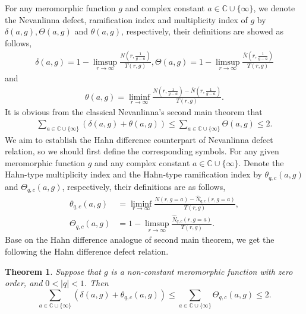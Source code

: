 \documentclass[sn-mathphys-num]{sn-jnl}%
\theoremstyle{thmstyleone}%
\newtheorem{theorem}{Theorem}%
\theoremstyle{thmstyletwo}%
\theoremstyle{thmstylethree}%
\begin{document}
\indent For any meromorphic function $g$ and complex constant $a\in\mathbb{C}\cup\{\infty\}$, we denote the Nevanlinna defect, ramification index and multiplicity index of $g$ by $\delta(a,g), \Theta(a,g)$ and $\theta(a,g)$, respectively, their definitions are showed as follows,
\begin{align*}
	\delta(a,g)=1-\limsup\limits_{r\rightarrow\infty}\frac{N\left(r,\frac{1}{g-a}\right)}{T(r,g)},
	\Theta(a,g)=1-\limsup\limits_{r\rightarrow\infty}\frac{\overline{N}\left(r,\frac{1}{g-a}\right)}{T(r,g)}
\end{align*}
and
\begin{align*}
	\theta(a,g)=\liminf\limits_{r\rightarrow\infty}\frac{N\left(r,\frac{1}{g-a}\right)-\overline{N}\left(r,\frac{1}{g-a}\right)}{T(r,g)}.
\end{align*}
It is obvious from the classical Nevanlinna's second main theorem that
\begin{align*}
	\sum\limits_{a\in\mathbb{C}\cup\{\infty\}}(\delta(a,g)+\theta(a,g))\leq\sum\limits_{a\in\mathbb{C}\cup\{\infty\}}\Theta(a,g)\leq2.
\end{align*}		
We aim to establish the Hahn difference counterpart of Nevanlinna defect relation, so we should first define the corresponding symbols. For any given meromorphic function $g$ and any complex constant $a\in\mathbb{C}\cup\{\infty\}$. Denote the Hahn-type multiplicity index and the Hahn-type ramification index by $\theta_{q,c}(a,g)$ and $\Theta_{q,c}(a,g)$, respectively, their definitions are as follows,
\begin{align*}
	\theta_{q,c}(a,g)&=\liminf\limits_{r\rightarrow\infty}\frac{N(r,g=a)-\hat{N}_{q,c}(r,g=a)}{T(r,g)},\\
	\Theta_{q,c}(a,g)&=1-\limsup\limits_{r\rightarrow\infty}\frac{\hat{N}_{q,c}(r,g=a)}{T(r,g)}.
\end{align*}		
\indent Base on the Hahn difference analogue of second main theorem, we get the following the Hahn difference defect relation.
\begin{theorem}
	Suppose that $g$ is a non-constant meromorphic function with zero order, and $0<|q|<1$. Then
	 $$\sum\limits_{a\in\mathbb{C}\cup\{\infty\}}(\delta(a,g)+\theta_{q,c}(a,g))\leq\sum\limits_{a\in\mathbb{C}\cup\{\infty\}}\Theta_{q,c}(a,g)\leq2.$$
\end{theorem}		
\end{document}
